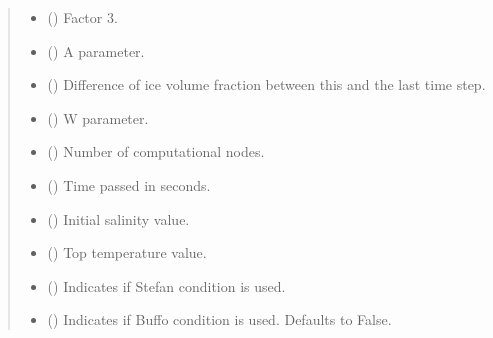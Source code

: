 \documentclass[a4paper,11pt,english,openany]{sphinxmanual}
\begin{document}
\begin{fulllineitems}
\begin{quote}
\begin{description}
\begin{itemize}
\item {} 
\sphinxAtStartPar
{} () \textendash{} Factor 3.

\item {} 
\sphinxAtStartPar
{} () \textendash{} A parameter.

\item {} 
\sphinxAtStartPar
{} () \textendash{} Difference of ice volume fraction between this and the last time step.

\item {} 
\sphinxAtStartPar
{} () \textendash{} W parameter.

\item {} 
\sphinxAtStartPar
{} () \textendash{} Number of computational nodes.

\item {} 
\sphinxAtStartPar
{} () \textendash{} Time passed in seconds.

\item {} 
\sphinxAtStartPar
{} () \textendash{} Initial salinity value.

\item {} 
\sphinxAtStartPar
{} () \textendash{} Top temperature value.

\item {} 
\sphinxAtStartPar
{} () \textendash{} Indicates if Stefan condition is used.

\item {} 
\sphinxAtStartPar
{} (\sphinxstyleliteralemphasis{\sphinxupquote{, }}) \textendash{} Indicates if Buffo condition is used. Defaults to False.


\end{itemize}
\end{description}
\end{quote}
\end{fulllineitems}
\end{document}
